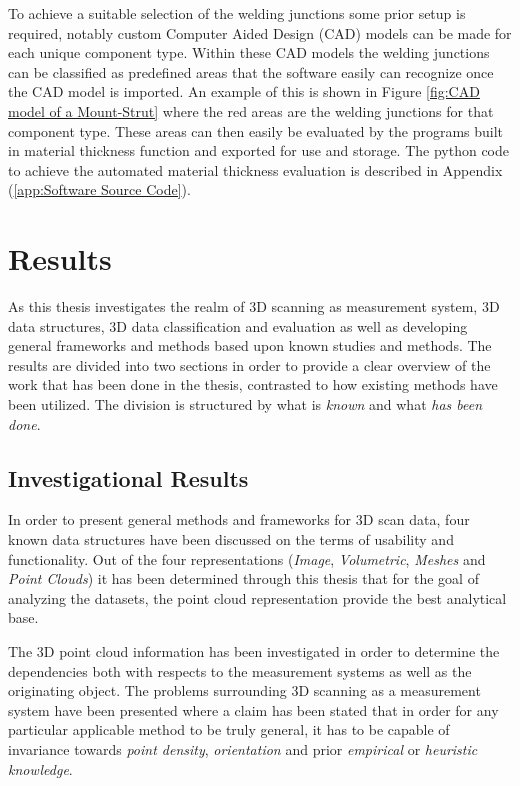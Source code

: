 \documentclass[%
]{USN-MSc}
\begin{document}
To achieve a suitable selection of the welding junctions some prior setup is required, notably custom Computer Aided Design (CAD) models can be made for each unique component type. Within these CAD models the welding junctions can be classified as predefined areas that the software easily can recognize once the CAD model is imported. An example of this is shown in Figure \ref{fig:CAD model of a Mount-Strut} where the red areas are the welding junctions for that component type. These areas can then easily be evaluated by the programs built in material thickness function and exported for use and storage. The python code to achieve the automated material thickness evaluation is described in Appendix (\ref{app:Software Source Code}).






\chapter{Results}
\label{ch:results}

As this thesis investigates the realm of 3D scanning as measurement system, 3D data structures, 3D data classification and evaluation as well as developing general frameworks and methods based upon known studies and methods. The results are divided into two sections in order to provide a clear overview of the work that has been done in the thesis, contrasted to how existing methods have been utilized. The division is structured by what is \textit{known} and what \textit{has been done}.

\section{Investigational Results}
In order to present general methods and frameworks for 3D scan data, four known data structures have been discussed on the terms of usability and functionality. Out of the four representations (\textit{Image}, \textit{Volumetric}, \textit{Meshes} and \textit{Point Clouds}) it has been determined through this thesis that for the goal of analyzing the datasets, the point cloud representation provide the best analytical base.

The 3D point cloud information has been investigated in order to determine the dependencies both with respects to the measurement systems as well as the originating object. The problems surrounding 3D scanning as a measurement system have been presented where a claim has been stated that in order for any particular applicable method to be truly general, it has to be capable of invariance towards \textit{point density}, \textit{orientation} and prior \textit{empirical} or \textit{heuristic knowledge}.
\end{document}

